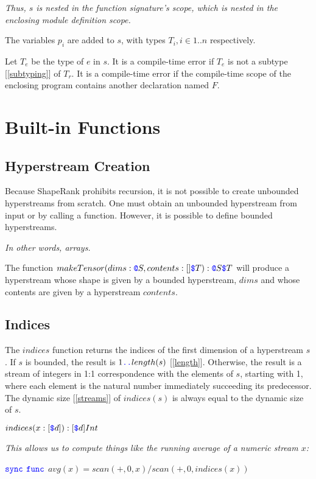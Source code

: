 \documentclass{article}
\begin{document}
{\em Thus, $s$ is nested in the function signature's scope, which is nested in the enclosing module definition scope.}

The variables $p_i$ are added to $s$, with types $T_i, i \in 1..n$ respectively.

Let $T_e$ be the type of $e$ in $s$. 
It is a compile-time error if  $T_e$ is not a subtype [\ref{subtyping}] of $T_r$.  It is a compile-time error if the compile-time scope of the enclosing program contains another declaration named $F$.

\section{Built-in Functions}
\label{builtinFunctions}


\subsection{Hyperstream Creation}
\label{streamCreation}

Because ShapeRank prohibits recursion, it is not possible to create unbounded hyperstreams from scratch. One must obtain an unbounded hyperstream from input or by calling a function.
However, it is possible to define bounded hyperstreams.

{\em In other words, arrays.}

The function $makeTensor(dims: \texttt{\color{blue} @}{}S, contents: []\texttt{\color{blue} \$}{}T):\texttt{\color{blue} @}{}S \texttt{\color{blue} \$}{}T$
will produce a hyperstream whose shape is given by a bounded hyperstream, $dims$ and whose contents are given by a hyperstream $contents$.

\subsection{Indices}
\label{indices}

The $indices$ function returns the indices of the first dimension of a hyperstream $s$. If $s$ is bounded, the result is $1 \texttt{\color{blue} ..}{} length(s)$ [\ref{length}].  Otherwise, the result is a stream of integers in 1:1 correspondence with the elements of $s$, starting with 1, where each element is the natural number immediately succeeding its predecessor. The dynamic size [\ref{streams}] of $indices(s)$ is always equal to the dynamic size of $s$.

$indices(x: [\texttt{\color{blue} \$}{}d]): [\texttt{\color{blue} \$}{}d] Int$

{\em
This allows us to compute things like the running average of a numeric stream $x$:

$\texttt{\color{blue} sync}{}$  $\texttt{\color{blue} func}{}$ $avg(x) = scan(+, 0, x)/scan(+, 0, indices(x))$
}
\end{document}
